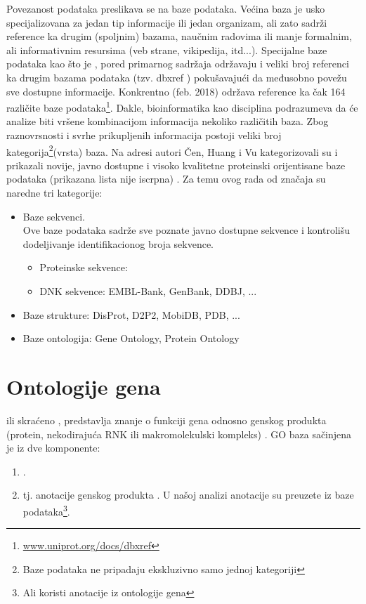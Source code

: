 Povezanost podataka preslikava se na baze podataka. Većina baza je usko specijalizovana
za jedan tip informacije ili jedan organizam, ali zato sadrži reference ka
drugim (spoljnim) bazama, naučnim radovima ili  manje formalnim, ali
informativnim resursima (veb strane, vikipedija, itd...). Specijalne baze podataka kao
što je \uniprotkb, pored primarnog sadržaja održavaju i veliki broj referenci ka
drugim bazama podataka (tzv. dbxref ) pokušavajući
da međusobno povežu sve dostupne informacije. Konkrentno \uniprotkb (feb. 2018)
održava reference ka čak 164 različite baze
podataka\footnote{\url{www.uniprot.org/docs/dbxref}}.  Dakle, bioinformatika
kao disciplina podrazumeva da će analize biti vršene kombinacijom informacija
nekoliko različitih baza.  Zbog raznovrsnosti i svrhe prikupljenih informacija
postoji veliki broj kategorija\footnote{Baze podataka ne pripadaju ekskluzivno
samo jednoj kategoriji}(vrsta) baza. Na adresi \cite{dbSummary2015} autori Čen, Huang i Vu
kategorizovali su i prikazali novije, javno dostupne i visoko kvalitetne
proteinski orijentisane baze podataka (prikazana lista nije iscrpna) \parencite{Chen2017}.
Za temu ovog rada od značaja su naredne tri kategorije:

\begin{itemize}
  \item Baze sekvenci.\\ 
        Ove baze podataka sadrže sve poznate javno dostupne sekvence i kontrolišu dodeljivanje 
        identifikacionog broja sekvence.
    \begin{itemize}
      \item Proteinske sekvence: \uniprotkb
      \item DNK sekvence: EMBL-Bank, GenBank, DDBJ, ...
    \end{itemize}
  \item Baze strukture: DisProt, D2P2, MobiDB, PDB, ...
  \item Baze ontologija: Gene Ontology, Protein Ontology
\end{itemize}


\section{Ontologije gena}
\label{GO}

  ili skraćeno , 
predstavlja znanje o funkciji gena odnosno genskog
produkta (protein, nekodirajuća RNK ili makromolekulski kompleks)
\parencite{GO2016}.
GO baza sačinjena je iz dve komponente:
\begin{enumerate}
  \item {}.
  \item {} tj. anotacije genskog produkta . U našoj
    analizi anotacije su preuzete iz \swissprot baze podataka\footnote{Ali \swissprot koristi anotacije iz ontologije gena}.
\end{enumerate}

